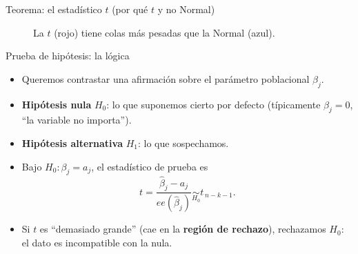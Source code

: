 \documentclass{beamer}
\begin{document}
\begin{frame}[allowframebreaks]{Teorema: el estadístico $t$ (por qué $t$ y no Normal)}
\begin{figure}
\centering
{}
\caption{La $t$ (rojo) tiene colas más pesadas que la Normal (azul).}
\end{figure}
\end{frame}

\begin{frame}{Prueba de hipótesis: la lógica}
\begin{itemize}
    \item Queremos contrastar una afirmación sobre el parámetro poblacional $\beta_j$.
    \item \textbf{Hipótesis nula} $H_0$: lo que suponemos cierto por defecto (típicamente $\beta_j = 0$, ``la variable no importa'').
    \item \textbf{Hipótesis alternativa} $H_1$: lo que sospechamos.
    \pause
    \item Bajo $H_0:\beta_j = a_j$, el estadístico de prueba es
    \[
    t = \frac{\hat{\beta}_j - a_j}{ee(\hat{\beta}_j)} \underset{H_0}{\sim} t_{\,n-k-1}.
    \]
    \pause
    \item Si $t$ es ``demasiado grande'' (cae en la \textbf{región de rechazo}), rechazamos $H_0$: el dato es incompatible con la nula.
\end{itemize}
\end{frame}
\end{document}
